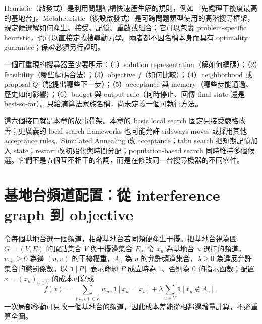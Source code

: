 \documentclass[11pt,a4paper,oneside,openany]{book}
\begin{document}
\begin{definition}
Heuristic（啟發式）是利用問題結構快速產生解的規則，例如「先處理干擾度最高的基地台」。Metaheuristic（後設啟發式）是可跨問題類型使用的高階搜尋框架，規定候選解如何產生、接受、記憶、重啟或組合；它可以包裹 problem-specific heuristic，也可以直接定義搜尋動力學。兩者都不因名稱本身而具有 optimality guarantee；保證必須另行證明。
\end{definition}

\begin{definition}[搜尋問題的六個接口]
一個可重現的搜尋器至少要明示：（1）solution representation（解如何編碼）；（2）feasibility（哪些編碼合法）；（3）objective $f$（如何比較）；（4）neighborhood 或 proposal $Q$（能提出哪些下一步）；（5）acceptance 與 memory（哪些步能通過、歷史如何影響）；（6）budget 與 output rule（何時停止、回傳 final state 還是 best-so-far）。只給演算法家族名稱，尚未定義一個可執行方法。
\end{definition}

這六個接口就是本章的故事骨架。本章的 basic local search 固定只接受嚴格改善；更廣義的 local-search frameworks 也可能允許 sideways moves 或採用其他 acceptance rules。Simulated Annealing 改 acceptance；tabu search 把短期記憶加入 state；restart 改初始化與時間分配；population-based search 同時維持多個候選。它們不是五個互不相干的名詞，而是在修改同一台搜尋機器的不同零件。

\section{基地台頻道配置：從 interference graph 到 objective}
令每個基地台選一個頻道，相鄰基地台若同頻便產生干擾。把基地台視為圖 $G=(V,E)$ 的頂點集合 $V$ 與干擾邊集合 $E$。令 $x_u$ 為基地台 $u$ 選擇的頻道，$w_{uv}\ge0$ 為邊 $(u,v)$ 的干擾權重，$A_u$ 為 $u$ 的允許頻道集合，$\lambda\ge0$ 為違反允許集合的懲罰係數。以 $\mathbf 1[P]$ 表示命題 $P$ 成立時為 1、否則為 0 的指示函數；配置 $x=(x_u)_{u\in V}$ 的成本可寫成
\begin{equation}
 f(x)=\sum_{(u,v)\in E} w_{uv}\,\mathbf{1}[x_u=x_v]
      +\lambda\sum_{u\in V}\mathbf{1}[x_u\notin A_u],
 \label{eq:channel-cost}
\end{equation}
一次局部移動可只改一個基地台的頻道，因此成本差能從相鄰邊增量計算，不必重算全圖。
\end{document}
